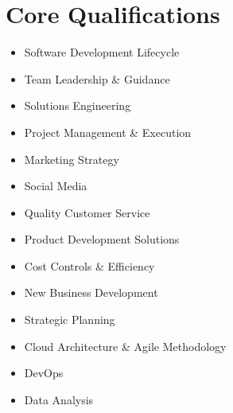 \section{Core Qualifications}
\begin{itemize}
    \item Software Development Lifecycle 
    \item Team Leadership \& Guidance 
    \item Solutions Engineering 
    \item Project Management \& Execution
    \item Marketing Strategy 
    \item Social Media 
    \item Quality Customer Service 
    \item Product Development Solutions 
    \item Cost Controls \& Efficiency
    \item New Business Development 
    \item Strategic Planning 
    \item Cloud Architecture \& Agile Methodology 
    \item DevOps 
    \item Data Analysis
\end{itemize}

